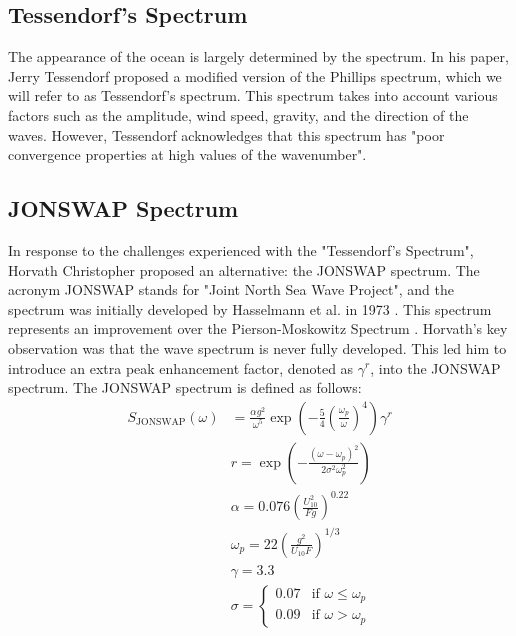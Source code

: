 \subsection{Tessendorf's Spectrum}
The appearance of the ocean is largely determined by the spectrum. In his paper, Jerry Tessendorf \cite{tessendorf2001} proposed a modified version of the Phillips spectrum, which we will refer to as Tessendorf's spectrum. This spectrum takes into account various factors such as the amplitude, wind speed, gravity, and the direction of the waves. However, Tessendorf acknowledges that this spectrum has "poor convergence properties at high values of the wavenumber".

\subsection{JONSWAP Spectrum}
In response to the challenges experienced with the "Tessendorf's Spectrum", Horvath Christopher \cite{horvath2015} proposed an alternative: the JONSWAP spectrum. The acronym JONSWAP stands for "Joint North Sea Wave Project", and the spectrum was initially developed by Hasselmann et al. in 1973 \cite{hasselmann1973}. This spectrum represents an improvement over the Pierson-Moskowitz Spectrum \cite{pierson1964}. Horvath's key observation was that the wave spectrum is never fully developed. This led him to introduce an extra peak enhancement factor, denoted as $\gamma^r$, into the JONSWAP spectrum.
The JONSWAP spectrum is defined as follows:
\begin{equation}
    \begin{aligned}
        S_{\text{JONSWAP}}(\omega) &= \frac{\alpha g^{2}}{\omega^{5}} \exp \left(-\frac{5}{4} \left(\frac{\omega_{p}}{\omega}\right)^{4}\right) \gamma^{r} \\
        &r = \exp\left(-\frac{(\omega - \omega_p)^{2}}{2 \sigma^{2}\omega^{2}_p}\right) \\
        &\alpha = 0.076 \left( \frac{U^{2}_{10}}{Fg} \right)^{0.22} \\
        &\omega_p = 22 \left( \frac{g^{2}}{U_{10}F} \right)^{1/3} \\
        &\gamma = 3.3 \\
        &\sigma = 
        \begin{cases} 
        0.07 & \text{if } \omega \leq \omega_p \\
        0.09 & \text{if } \omega > \omega_p
        \end{cases}
    \end{aligned}
\end{equation}

